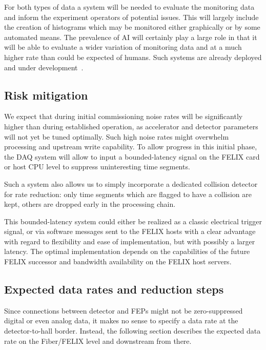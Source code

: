For both types of data a system will be needed to evaluate the monitoring data and inform the experiment operators of potential issues. This will largely include the creation of histograms which may be monitored either graphically or by some automated means. The prevalence of AI will certainly play a large role in that it will be able to evaluate a wider variation of monitoring data and at a much higher rate than could be expected of humans. Such systems are already deployed and under development~\cite{Hydra2021}. 

\subsection{Risk mitigation}
We expect that during initial commissioning noise rates will be significantly higher than during established operation, as accelerator and detector parameters will not yet be tuned optimally. Such high noise rates might overwhelm processing and upstream write capability. To allow progress in this initial phase, the DAQ system will allow to input a bounded-latency signal on the FELIX card or host CPU level to suppress uninteresting time segments.

Such a system also allows us to simply incorporate a dedicated collision detector for rate reduction: only time segments which are flagged to have a collision are kept, others are dropped early in the processing chain. 

This bounded-latency system could either be realized as a classic electrical trigger signal, or via software messages sent to the FELIX hosts with a clear advantage with regard to flexibility and ease of implementation, but with possibly a larger latency. The optimal implementation depends on the capabilities of the future FELIX successor and bandwidth availability on the FELIX host servers.

\subsection{Expected data rates and reduction steps}


Since connections between detector and FEPs might not be zero-suppressed digital or even analog data, it makes no sense to specify a data rate at the detector-to-hall border. Instead, the following section describes the expected data rate on the Fiber/FELIX level and downstream from there.


